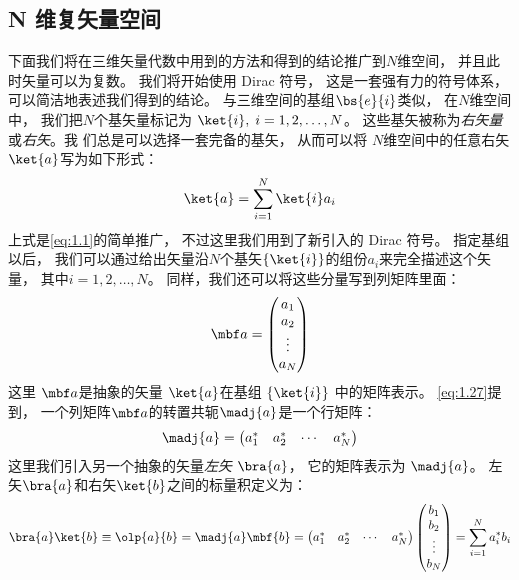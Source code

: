 \subsection{N 维复矢量空间}
\label{sec:1.1.4}
下面我们将在三维矢量代数中用到的方法和得到的结论推广到$N$维空间，
并且此时矢量可以为复数。
我们将开始使用 Dirac 符号，
这是一套强有力的符号体系，
可以简洁地表述我们得到的结论。
与三维空间的基组$\bs{e}{i}$类似，
在$N$维空间中，
我们把$N$个基矢量标记为 $\ket{i},\; i = 1, 2, \dots, N$。
这些基矢被称为\emph{右矢量}或\emph{右矢}。我
们总是可以选择一套完备的基矢，
从而可以将 $N$维空间中的任意右矢 $\ket{a}$写为如下形式：
\begin{equation}
 \ket{a} = \sum_{i=1}^{N} \ket{i} a_i
 \label{eq:1.41}
\end{equation}
上式是\autoref{eq:1.1}的简单推广，
不过这里我们用到了新引入的 Dirac 符号。
指定基组以后，
我们可以通过给出矢量沿$N$个基矢$\left\{\ket{i}\right\}$的组份$a_i$来完全描述这个矢量，
其中$i = 1, 2, \dots, N$。
同样，我们还可以将这些分量写到列矩阵里面：
\begin{equation}
 {\mbf a} = \begin{pmatrix}
     a_1 \\ a_2 \\ \vdots \\ a_N
 \end{pmatrix}
 \label{eq:1.42}
\end{equation}
这里 $\mbf a$是抽象的矢量 $\ket{a}$在基组 $\left\{\ket{i}\right\}$ 中的矩阵表示。
\autoref{eq:1.27}提到，
一个列矩阵$\mbf a$的转置共轭$\madj{a}$是一个行矩阵：
\begin{equation}
 \madj{a} = \begin{pmatrix}
     a_1^\ast & a_2^\ast &\cdots &a_N^\ast
 \end{pmatrix}
 \label{eq:1.43}
\end{equation}
这里我们引入另一个抽象的矢量\emph{左矢} $\bra{a}$，
它的矩阵表示为 $\madj{a}$。
左矢$\bra{a}$和右矢$\ket{b}$之间的标量积定义为：
\begin{equation}
 \bra{a}\ket{b} \equiv \olp{a}{b} = \madj{a}\mbf{b} = \begin{pmatrix}
     a_1^\ast & a_2^\ast &\cdots &a_N^\ast
 \end{pmatrix} \begin{pmatrix}
     b_1 \\ b_2 \\ \vdots \\ b_N
 \end{pmatrix} = \sum_{i=1}^N a_i^\ast b_i
 \label{eq:1.44}
\end{equation}
